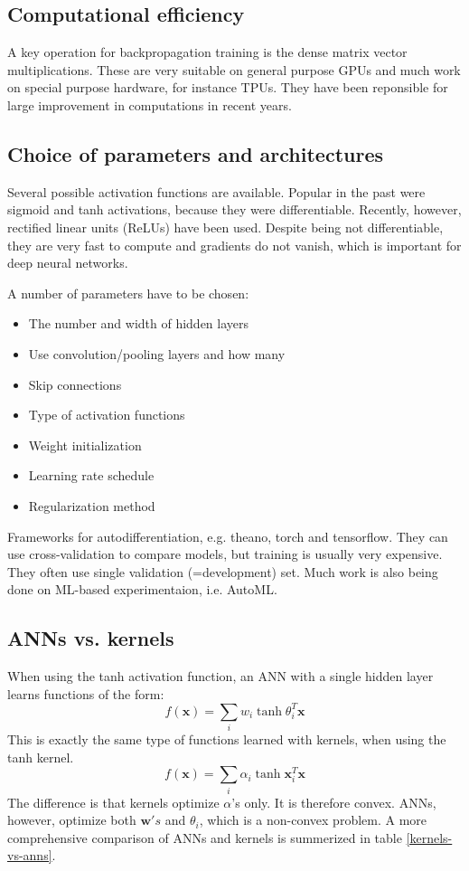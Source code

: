 \documentclass[a4paper,10pt,twoside]{article}
\begin{document}
\subsection{Computational efficiency}

A key operation for backpropagation training is the dense matrix vector multiplications. These are very suitable on general purpose GPUs and much work on special purpose hardware, for instance TPUs. They have been reponsible for large improvement in computations in recent years. 

\subsection{Choice of parameters and architectures}

Several possible activation functions are available. Popular in the past were sigmoid and tanh activations, because they were differentiable. Recently, however, rectified linear units (ReLUs) have been used. Despite being not differentiable, they are very fast to compute and gradients do not vanish, which is important for deep neural networks.

A number of parameters have to be chosen:
\begin{itemize}
    \item The number and width of hidden layers 
    \item Use convolution/pooling layers and how many
    \item Skip connections
    \item Type of activation functions
    \item Weight initialization
    \item Learning rate schedule
    \item Regularization method
\end{itemize}

Frameworks for autodifferentiation, e.g. theano, torch and tensorflow. They can use cross-validation to compare models, but training is usually very expensive. They often use single validation (=development) set. Much work is also being done on ML-based experimentaion, i.e. AutoML.

\subsection{ANNs vs. kernels}

When using the tanh activation function, an ANN with a single hidden layer learns functions of the form:
\begin{equation*}
    f(\mathbf{x})=\sum_{i}w_i\tanh\theta^{T}_i\mathbf{x}
\end{equation*}
This is exactly the same type of functions learned with kernels, when using the tanh kernel.
\begin{equation*}
    f(\mathbf{x})=\sum_{i}\alpha_i\tanh\mathbf{x}_i^T\mathbf{x}
\end{equation*}
The difference is that kernels optimize $\alpha$'s only. It is therefore convex. ANNs, however, optimize both $\mathbf{w}'s$ and $\theta_i$, which is a non-convex problem. A more comprehensive comparison of ANNs and kernels is summerized in table \ref{kernels-vs-anns}.
\end{document}
